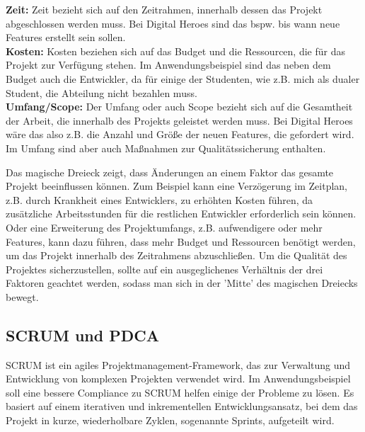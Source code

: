 \textbf{Zeit:} Zeit bezieht sich auf den Zeitrahmen, innerhalb dessen das Projekt abgeschlossen werden muss. 
Bei Digital Heroes sind das bspw. bis wann neue Features erstellt sein sollen. \\
\textbf{Kosten:} Kosten beziehen sich auf das Budget und die Ressourcen, die für das Projekt zur Verfügung stehen. 
Im Anwendungsbeispiel sind das neben dem Budget auch die Entwickler, da für einige der Studenten, wie z.B. 
mich als dualer Student, die Abteilung nicht bezahlen muss. \\
\textbf{Umfang/Scope:} Der Umfang oder auch Scope bezieht sich auf die Gesamtheit der Arbeit, 
die innerhalb des Projekts geleistet werden muss.
Bei Digital Heroes wäre das also z.B. die Anzahl und Größe der neuen Features, die gefordert wird. 
Im Umfang sind aber auch Maßnahmen zur Qualitätssicherung enthalten.  

Das magische Dreieck zeigt, dass Änderungen an einem Faktor das gesamte Projekt beeinflussen können. 
Zum Beispiel kann eine Verzögerung im Zeitplan, z.B. durch Krankheit eines Entwicklers, zu erhöhten Kosten führen, 
da zusätzliche Arbeitsstunden für die restlichen Entwickler erforderlich sein können. 
Oder eine Erweiterung des Projektumfangs, z.B. aufwendigere oder mehr Features, kann dazu führen, 
dass mehr Budget und Ressourcen benötigt werden, 
um das Projekt innerhalb des Zeitrahmens abzuschließen.
Um die Qualität des Projektes sicherzustellen, sollte auf ein ausgeglichenes Verhältnis der drei Faktoren 
geachtet werden, sodass man sich in der 'Mitte' des magischen Dreiecks bewegt. 


\subsection*{SCRUM und PDCA}

SCRUM ist ein agiles Projektmanagement-Framework, 
das zur Verwaltung und Entwicklung von komplexen Projekten verwendet wird. 
Im Anwendungsbeispiel soll eine bessere Compliance zu SCRUM helfen einige der Probleme zu lösen. 
Es basiert auf einem iterativen und inkrementellen Entwicklungsansatz, 
bei dem das Projekt in kurze, wiederholbare Zyklen, sogenannte Sprints, aufgeteilt wird.

